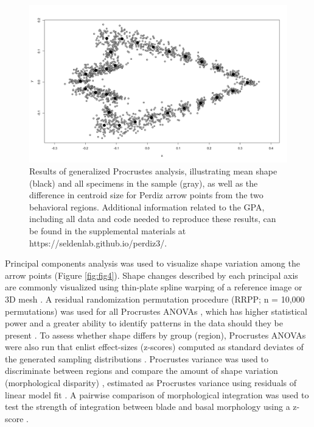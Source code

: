 \documentclass[smallextended]{svjour3}       %
\begin{document}
\begin{figure}
\includegraphics[width=0.95\linewidth]{ms-figs/figure3} \caption{Results of generalized Procrustes analysis, illustrating mean shape (black) and all specimens in the sample (gray), as well as the difference in centroid size for Perdiz arrow points from the two behavioral regions. Additional information related to the GPA, including all data and code needed to reproduce these results, can be found in the supplemental materials at https://seldenlab.github.io/perdiz3/.}\label{fig:fig3}
\end{figure}

Principal components analysis \cite{RN8576,RN10875} was used to
visualize shape variation among the arrow points (Figure
\ref{fig:fig4}). Shape changes described by each principal axis are
commonly visualized using thin-plate spline warping of a reference image
or 3D mesh \cite{RN8555,RN8553}. A residual randomization permutation
procedure (RRPP; n = 10,000 permutations) was used for all Procrustes
ANOVAs \cite{RN8579,RN8334}, which has higher statistical power and a
greater ability to identify patterns in the data should they be present
\cite{RN6995}. To assess whether shape differs by group (region),
Procrustes ANOVAs \cite{RN7046} were also run that enlist effect-sizes
(z-scores) computed as standard deviates of the generated sampling
distributions \cite{RN8477}. Procrustes variance was used to
discriminate between regions and compare the amount of shape variation
(morphological disparity) \cite{RN5703}, estimated as Procrustes
variance using residuals of linear model fit \cite{RN8314}. A pairwise
comparison of morphological integration was used to test the strength of
integration between blade and basal morphology using a z-score
\cite{RN8588,RN8477,RN8340,RN10874}.
\end{document}

